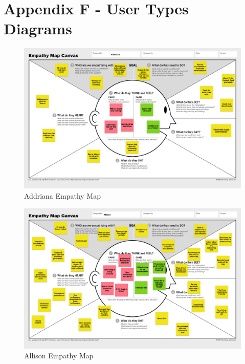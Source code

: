 \documentclass[main.tex]{subfiles}
\begin{document}
\section{Appendix F - User Types Diagrams}
\label{user_types}

\begin{figure}[H]
    \centering
    \includegraphics[angle=90,origin=c,width=1.1\textwidth,height=0.8\textheight]{08Appendices/085Background/085Pictures/Addriana_emp.png}
    \caption{Addriana Empathy Map}
 \end{figure}

 \begin{figure}[H]
    \centering
    \includegraphics[angle=90,origin=c,width=1.1\textwidth,height=0.8\textheight]{08Appendices/085Background/085Pictures/Allison_emp.png}
    \caption{Allison Empathy Map}
 \end{figure}
\end{document}
